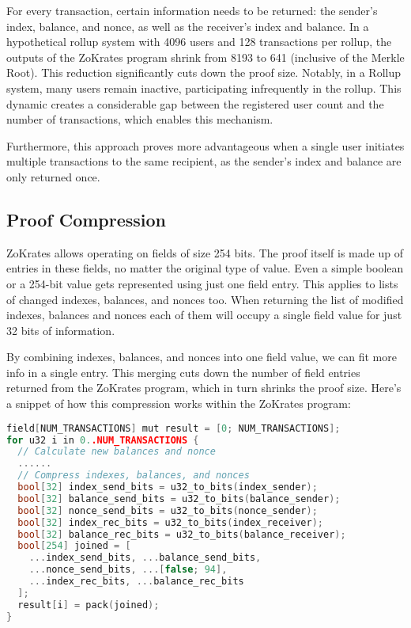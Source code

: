 For every transaction, certain information needs to be returned: the sender's index, balance, and nonce, as well as the receiver's index and balance. In a hypothetical rollup system with 4096 users and 128 transactions per rollup, the outputs of the ZoKrates program shrink from 8193 to 641 (inclusive of the Merkle Root). This reduction significantly cuts down the proof size. Notably, in a Rollup system, many users remain inactive, participating infrequently in the rollup. This dynamic creates a considerable gap between the registered user count and the number of transactions, which enables this mechanism.

Furthermore, this approach proves more advantageous when a single user initiates multiple transactions to the same recipient, as the sender's index and balance are only returned once.

\subsection{Proof Compression \label{subsec:5_compression}}

ZoKrates allows operating on fields of size 254 bits. The proof itself is made up of entries in these fields, no matter the original type of value. Even a simple boolean or a 254-bit value gets represented using just one field entry. This applies to lists of changed indexes, balances, and nonces too. When returning the list of modified indexes, balances and nonces each of them will occupy a single field value for just 32 bits of information.

By combining indexes, balances, and nonces into one field value, we can fit more info in a single entry. This merging cuts down the number of field entries returned from the ZoKrates program, which in turn shrinks the proof size. Here's a snippet of how this compression works within the ZoKrates program:

\begin{lstlisting}[language=C++]
field[NUM_TRANSACTIONS] mut result = [0; NUM_TRANSACTIONS];
for u32 i in 0..NUM_TRANSACTIONS {
  // Calculate new balances and nonce
  ......
  // Compress indexes, balances, and nonces
  bool[32] index_send_bits = u32_to_bits(index_sender);
  bool[32] balance_send_bits = u32_to_bits(balance_sender);
  bool[32] nonce_send_bits = u32_to_bits(nonce_sender);
  bool[32] index_rec_bits = u32_to_bits(index_receiver);
  bool[32] balance_rec_bits = u32_to_bits(balance_receiver);
  bool[254] joined = [
    ...index_send_bits, ...balance_send_bits,
    ...nonce_send_bits, ...[false; 94],
    ...index_rec_bits, ...balance_rec_bits
  ];
  result[i] = pack(joined);
}
\end{lstlisting}

